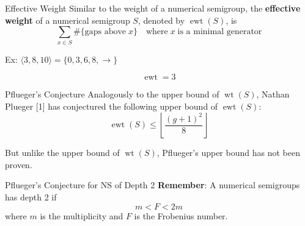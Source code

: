 \documentclass{beamer}
\DeclareMathOperator{\ewt}{ewt}
\DeclareMathOperator{\wt}{wt}
\begin{document}
\begin{frame}{Effective Weight}
    Similar to the weight of a numerical semigroup, the \textbf{effective weight} of a numerical semigroup $S$, denoted by $\ewt(S)$, is
    \[\sum_{x\in S} \#\{\text{gaps above}\; x\}\quad\text{where}\; x\;\text{is a minimal generator}\]

    Ex: $\langle3,8,10\rangle=\{0,3,6,8,\to\}$    

    \begin{center}
    \end{center}
    
    \[\ewt=3\]
\end{frame}

\begin{frame}{Pflueger's Conjecture}
    Analogously to the upper bound of $\wt(S)$, Nathan Plueger [1] has conjectured the following upper bound of $\ewt(S)$:
  \[\ewt(S)\leq\left\lfloor\frac{(g+1)^2}{8} \right\rfloor\]

  But unlike the upper bound of $\wt(S)$, Pflueger's upper bound has not been proven.
\end{frame}

\begin{frame}{Pflueger's Conjecture for NS of Depth 2}
    \textbf{Remember}: A numerical semigroups has depth 2 if
    \[m<F<2m\]
    where $m$ is the multiplicity and $F$ is the Frobenius number.
\end{frame}
\end{document}
